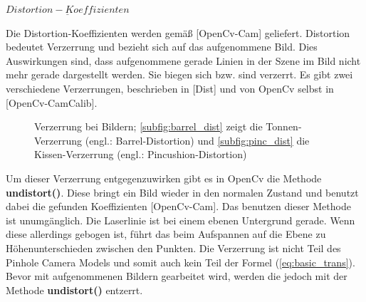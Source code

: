 		$\underline{Distortion-Koeffizienten}$
		
		Die Distortion-Koeffizienten werden gemäß [OpenCv-Cam] geliefert. Distortion bedeutet Verzerrung und bezieht sich auf das aufgenommene Bild. Dies Auswirkungen sind, dass aufgenommene gerade Linien in der Szene im Bild nicht mehr gerade dargestellt werden. Sie biegen sich bzw. sind verzerrt. Es gibt zwei verschiedene Verzerrungen, beschrieben in [Dist] und von OpenCv selbst in [OpenCv-CamCalib].
		
		\begin{figure}[h]
			\centering
			\caption[Verzerrung bei Bildern]{Verzerrung bei Bildern; \ref{subfig:barrel_dist} zeigt die Tonnen-Verzerrung (engl.: Barrel-Distortion) und \ref{subfig:pinc_dist} die Kissen-Verzerrung (engl.: Pincushion-Distortion)}
			\label{fig:distortion}
		\end{figure}
	
		Um dieser Verzerrung entgegenzuwirken gibt es in OpenCv die Methode \textbf{undistort()}. Diese bringt ein Bild wieder in den normalen Zustand und benutzt dabei die gefunden Koeffizienten [OpenCv-Cam]. Das benutzen dieser Methode ist unumgänglich. Die Laserlinie ist bei einem ebenen Untergrund gerade. Wenn diese allerdings gebogen ist, führt das beim Aufspannen auf die Ebene zu Höhenunterschieden zwischen den Punkten. Die Verzerrung ist nicht Teil des Pinhole Camera Models und somit auch kein Teil der Formel (\ref{eq:basic_trans}). Bevor mit aufgenommenen Bildern gearbeitet wird, werden die jedoch mit der Methode \textbf{undistort()} entzerrt.
		
